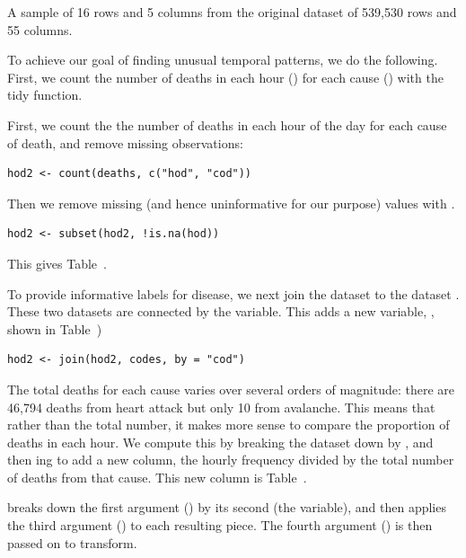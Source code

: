 \documentclass[article]{jss}
\begin{document}
\begin{table}
  \centering
  
  \caption{A sample of 16 rows and 5 columns from the original dataset of 539,530 rows and 55 columns.}
  \label{fig:raw}
\end{table}

To achieve our goal of finding unusual temporal patterns, we do the following. First, we count the number of deaths in each hour () for each cause () with the tidy  function. 

First, we count the the number of deaths in each hour of the day for each cause of death, and remove missing observations:

\begin{Verbatim}
hod2 <- count(deaths, c("hod", "cod"))
\end{Verbatim}

Then we remove missing (and hence uninformative for our purpose) values with . 

\begin{Verbatim}
hod2 <- subset(hod2, !is.na(hod))
\end{Verbatim}

This gives Table~.

To provide informative labels for disease, we next join the dataset to the  dataset . These two datasets are connected by the  variable. This adds a new variable, , shown in Table~)

\begin{Verbatim}
hod2 <- join(hod2, codes, by = "cod")
\end{Verbatim}

The total deaths for each cause varies over several orders of magnitude: there are 46,794 deaths from heart attack but only 10 from avalanche. This means that rather than the total number, it makes more sense to compare the proportion of deaths in each hour. We compute this by breaking the dataset down by , and then ing to add a new  column, the hourly frequency divided by the total number of deaths from that cause. This new column is Table~.

 breaks down the first argument () by its second (the  variable), and then applies the third argument () to each resulting piece. The fourth argument () is then passed on to transform.
\end{document}
